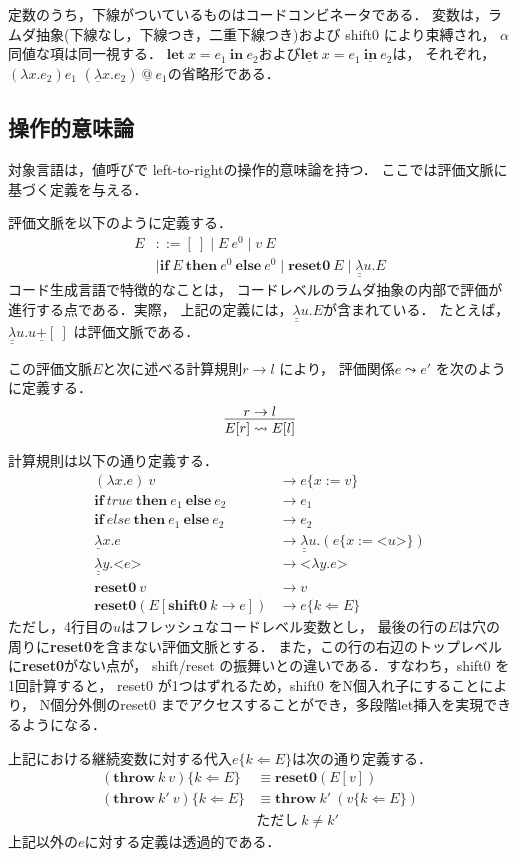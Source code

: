 \documentclass[T]{compsoft}
\makeatletter
\newcommand\fun[2]{\lambda{#1}.{#2}}
\newcommand\Resetz{\textbf{reset0}}
\newcommand\Shiftz{\textbf{shift0}}
\newcommand\Throw{\textbf{throw}}
\newcommand\throw[2]{\Throw~{#1}~{#2}}
\newcommand\cfun[2]{\underline{\lambda}{#1}.{#2}}
\newcommand\ccfun[2]{\underline{\underline{\lambda}}{#1}.{#2}}
\newcommand\cPlus{\underline{\textbf{+}}}
\newcommand\cLet{\underline{\textbf{let}}}
\newcommand\cIn{\underline{\textbf{in}}}
\newcommand\clet[3]{\cLet~{#1}={#2}~\cIn~{#3}}
\newcommand\code[1]{\texttt{<}{#1}\texttt{>}}
\newcommand\Let{\textbf{let}}
\newcommand\In{\textbf{in}}
\newcommand\letin[3]{\Let~{#1}={#2}~\In~{#3}}
\newcommand\ift[3]{\textbf{if}~{#1}~\textbf{then}~{#2}~\textbf{else}~{#3}}
\newcommand\lto{\leadsto}
\newcommand\cat{~\underline{@}~}
\newcommand\ksubst[2]{\{{#1}\Leftarrow{#2}\}}
\theoremstyle{break}
\makeatother
\begin{document}
定数のうち，下線がついているものはコードコンビネータである．
変数は，ラムダ抽象(下線なし，下線つき，二重下線つき)および shift0 により束縛され，
$\alpha$同値な項は同一視する．
$\letin{x}{e_1}{e_2}$および$\clet{x}{e_1}{e_2}$は，
それぞれ，$(\fun{x}{e_2})e_1$
$(\cfun{x}{e_2})\cat e_1$の省略形である．

\subsection{操作的意味論}

対象言語は，値呼びで left-to-rightの操作的意味論を持つ．
ここでは評価文脈に基づく定義を与える．

評価文脈を以下のように定義する．
\begin{align*}
  E & ::= [~] \mid E~ e^0 \mid v~ E \\
    & \mid \ift{E}{e^0}{e^0} \mid \Resetz~ E \mid \ccfun{u}{E}
\end{align*}
コード生成言語で特徴的なことは，
コードレベルのラムダ抽象の内部で評価が進行する点である．実際，
上記の定義には，$\ccfun{u}{E}$が含まれている．
たとえば，$\ccfun{u}{u \cPlus [~]}$ は評価文脈である．

この評価文脈$E$と次に述べる計算規則$r \to l$ により，
評価関係$e \lto e'$ を次のように定義する．
\[
  \infer{E[r] \lto E[l]}{r \to l}
\]

計算規則は以下の通り定義する．
\begin{align*}
  (\fun{x}{e})~v &\to e\{ x := v \} \\
  \ift{true}{e_1}{e_2} &\to e_1 \\
  \ift{else}{e_1}{e_2} &\to e_2 \\
  \cfun{x}{e} &\to \ccfun{u}{(e\{ x := \code{u} \})} \\
  \ccfun{y}{\code{e}} &\to \code{\fun{y}{e}} \\
  \Resetz~ v &\to v \\
  \Resetz (E[\Shiftz~ k \to e]) &\to e \ksubst{k}{E}
\end{align*}
ただし，4行目の$u$はフレッシュなコードレベル変数とし，
最後の行の$E$は穴の周りに{\Resetz}を含まない評価文脈とする．
また，この行の右辺のトップレベルに{\Resetz}がない点が，
shift/reset の振舞いとの違いである．すなわち，shift0 を1回計算すると，
reset0 が1つはずれるため，shift0 をN個入れ子にすることにより，
N個分外側のreset0 までアクセスすることができ，多段階let挿入を実現でき
るようになる．

上記における継続変数に対する代入$e\ksubst{k}{E}$は次の通り定義する．
\begin{align*}
  (\throw{k}{v})\ksubst{k}{E} &\equiv \Resetz (E[v]) \\
  (\throw{k'}{v})\ksubst{k}{E} &\equiv \throw{k'}{(v\ksubst{k}{E})}
\\
& \text{ただし}~k \not= k'
\end{align*}
上記以外の$e$に対する定義は透過的である．
\end{document}
